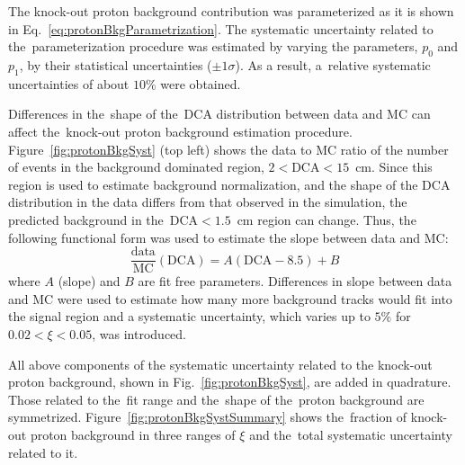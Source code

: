 The  knock-out proton background contribution was  parameterized as  it is shown in  Eq.~\eqref{eq:protonBkgParametrization}. The systematic uncertainty related to the~parameterization procedure was estimated by varying the   parameters, $p_0$ and $p_1$, by their statistical uncertainties ($\pm1\sigma$).  As a result, a~relative systematic uncertainties of about $10\%$ were obtained.

Differences in the~shape of the~$\textrm{DCA}$ distribution between data and \ac{MC} can affect the~knock-out proton background estimation procedure. Figure~\ref{fig:protonBkgSyst} (top left) shows the data to MC ratio of  the  number of events in the background dominated region, $2<\textrm{DCA}<15$~cm. 
Since this region is used to estimate background normalization, and the shape of the $\textrm{DCA}$ distribution in the data differs from that observed in the simulation, the predicted background in the~$\textrm{DCA} <1.5$~cm region can change. Thus, the following functional form was used to estimate the slope between data and MC:
\begin{equation}
\frac{\textrm{data}}{\textrm{MC}}\left(\textrm{DCA}\right) = A(\textrm{DCA}-8.5)+B
\label{eq:slopeBkgFit}
\end{equation}
where $A$ (slope) and  $B$ are fit free parameters. Differences in slope between data and \ac{MC} were used to estimate how many
more background tracks would fit into the signal region and a systematic uncertainty, which varies up to $5\%$ for $0.02< \xi<0.05$, was introduced. 




All above components of the systematic uncertainty related to the knock-out proton background,  shown in Fig.~\ref{fig:protonBkgSyst}, are added in quadrature.
Those related to the~fit range and the~shape of the~proton background are symmetrized. Figure~\ref{fig:protonBkgSystSummary} shows the~fraction of knock-out proton background in three ranges of $\xi$ and the~total systematic uncertainty related to it.

